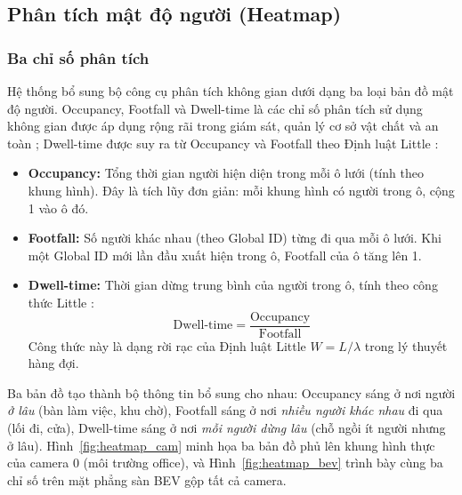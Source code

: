 \documentclass{article} %
\begin{document}
\subsection{Phân tích mật độ người (Heatmap)}

\subsubsection{Ba chỉ số phân tích}

Hệ thống bổ sung bộ công cụ phân tích không gian dưới dạng ba loại bản đồ mật độ người. Occupancy, Footfall và Dwell-time là các chỉ số phân tích sử dụng không gian được áp dụng rộng rãi trong giám sát, quản lý cơ sở vật chất và an toàn \cite{Spearpoint2020}; Dwell-time được suy ra từ Occupancy và Footfall theo Định luật Little \cite{Little1961}:

\begin{itemize}
    \item \textbf{Occupancy:} Tổng thời gian người hiện diện trong mỗi ô lưới (tính theo khung hình). Đây là tích lũy đơn giản: mỗi khung hình có người trong ô, cộng 1 vào ô đó.

    \item \textbf{Footfall:} Số người khác nhau (theo Global ID) từng đi qua mỗi ô lưới. Khi một Global ID mới lần đầu xuất hiện trong ô, Footfall của ô tăng lên 1.

    \item \textbf{Dwell-time:} Thời gian dừng trung bình của người trong ô, tính theo công thức Little \cite{Little1961}:
    \begin{equation}
        \text{Dwell-time} = \frac{\text{Occupancy}}{\text{Footfall}}
    \end{equation}
    Công thức này là dạng rời rạc của Định luật Little $W = L/\lambda$ trong lý thuyết hàng đợi.
\end{itemize}

Ba bản đồ tạo thành bộ thông tin bổ sung cho nhau: Occupancy sáng ở nơi người \textit{ở lâu} (bàn làm việc, khu chờ), Footfall sáng ở nơi \textit{nhiều người khác nhau} đi qua (lối đi, cửa), Dwell-time sáng ở nơi \textit{mỗi người dừng lâu} (chỗ ngồi ít người nhưng ở lâu). Hình~\ref{fig:heatmap_cam} minh họa ba bản đồ phủ lên khung hình thực của camera 0 (môi trường office), và Hình~\ref{fig:heatmap_bev} trình bày cùng ba chỉ số trên mặt phẳng sàn BEV gộp tất cả camera.
\end{document}
